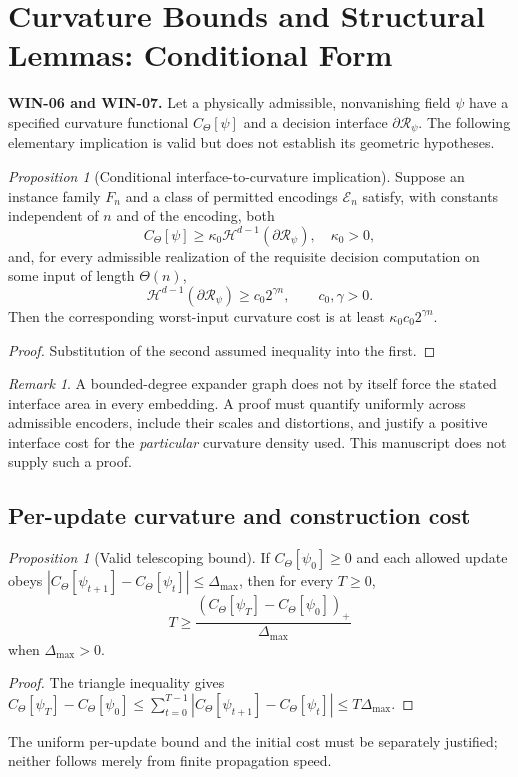 \documentclass[12pt]{article}
\theoremstyle{remark}
\newtheorem*{remark}{Remark}
\newtheorem{proposition}[theorem]{Proposition}
\begin{document}
\clearpage


\section{Curvature Bounds and Structural Lemmas: Conditional Form}
\label{sec:conditional-curv}
\noindent\textbf{WIN-06 and WIN-07.}
Let a physically admissible, nonvanishing field $\psi$ have a specified
curvature functional $C_\Theta[\psi]$ and a decision interface
$\partial\mathcal R_\psi$. The following elementary implication is
valid but does not establish its geometric hypotheses.
\begin{proposition}[Conditional interface-to-curvature implication]
\label{thm:separator_curvature}
Suppose an instance family $F_n$ and a class of permitted encodings
$\mathcal E_n$ satisfy, with constants independent of $n$ and of the
encoding, both
\[
C_\Theta[\psi]\ge\kappa_0\mathcal H^{d-1}
(\partial\mathcal R_\psi),\quad \kappa_0>0,
\]
and, for every admissible realization of the requisite decision
computation on some input of length $\Theta(n)$,
\[
\mathcal H^{d-1}(\partial\mathcal R_\psi)
\ge c_0 2^{\gamma n},\qquad c_0,\gamma>0.
\]
Then the corresponding worst-input curvature cost is at least
$\kappa_0c_0 2^{\gamma n}$.
\end{proposition}
\begin{proof}
Substitution of the second assumed inequality into the first.
\end{proof}
\begin{remark}
A bounded-degree expander graph does not by itself force the stated
interface area in every embedding. A proof must quantify uniformly
across admissible encoders, include their scales and distortions,
and justify a positive interface cost for the \emph{particular}
curvature density used. This manuscript does not supply such a proof.
\end{remark}

\subsection{Per-update curvature and construction cost}
\begin{proposition}[Valid telescoping bound]
\label{thm:mass_complexity}
If $C_\Theta[\psi_0]\ge0$ and each allowed update obeys
$|C_\Theta[\psi_{t+1}]-C_\Theta[\psi_t]|\le\Delta_{\max}$,
then for every $T\ge0$,
\[
T\ge\frac{(C_\Theta[\psi_T]-C_\Theta[\psi_0])_+}
{\Delta_{\max}}
\]
when $\Delta_{\max}>0$.
\end{proposition}
\begin{proof}
The triangle inequality gives
$C_\Theta[\psi_T]-C_\Theta[\psi_0]
\le\sum_{t=0}^{T-1}|C_\Theta[\psi_{t+1}]-C_\Theta[\psi_t]|
\le T\Delta_{\max}$.
\end{proof}
The uniform per-update bound and the initial cost must be separately
justified; neither follows merely from finite propagation speed.
\end{document}
